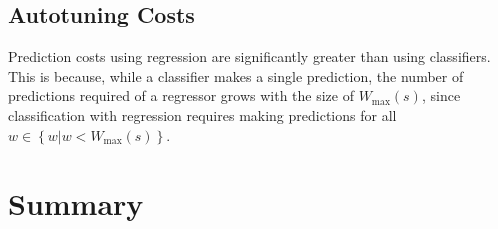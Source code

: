 \subsection{Autotuning Costs}

Prediction costs using regression are significantly greater than using
classifiers. This is because, while a classifier makes a single
prediction, the number of predictions required of a regressor grows
with the size of $W_{\max}(s)$, since classification with regression
requires making predictions for all
$w \in \left\{ w | w < W_{\max}(s) \right\}$.


\section{Summary}

% 

% 
